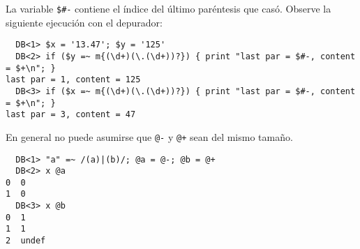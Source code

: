\label{parrafo:lastpar}

La variable \verb|$#-| contiene el índice del último paréntesis
que casó. Observe la siguiente ejecución con el depurador:
\begin{verbatim}
  DB<1> $x = '13.47'; $y = '125'
  DB<2> if ($y =~ m{(\d+)(\.(\d+))?}) { print "last par = $#-, content = $+\n"; }
last par = 1, content = 125
  DB<3> if ($x =~ m{(\d+)(\.(\d+))?}) { print "last par = $#-, content = $+\n"; }
last par = 3, content = 47
\end{verbatim}


En general no puede asumirse que \verb|@-| y \verb|@+| sean 
del mismo tamaño.
\begin{verbatim}
  DB<1> "a" =~ /(a)|(b)/; @a = @-; @b = @+
  DB<2> x @a
0  0
1  0
  DB<3> x @b
0  1
1  1
2  undef
\end{verbatim}

%

